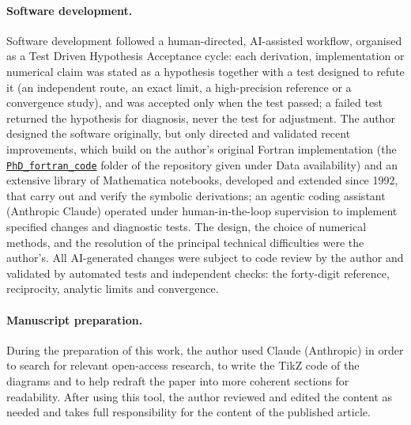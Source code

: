 \documentclass[11pt,a4paper]{article}
\begin{document}
\paragraph{Software development.} Software development followed a human-directed, AI-assisted
workflow, organised as a Test Driven Hypothesis Acceptance cycle: each derivation, implementation or
numerical claim was stated as a hypothesis together with a test designed to refute it (an independent
route, an exact limit, a high-precision reference or a convergence study), and was accepted only when
the test passed; a failed test returned the hypothesis for diagnosis, never the test for adjustment. The author designed the software originally, but only directed and validated recent
improvements, which build on the author's original Fortran implementation (the
\href{https://github.com/tmnestor/MultipleScatteringCalculations/tree/main/PhD_fortran_code}{\texttt{PhD\_fortran\_code}}
folder of the repository given under Data availability) and an extensive library of Mathematica notebooks,
developed and extended since 1992, that carry out and verify the symbolic derivations; an agentic coding
assistant (Anthropic Claude) operated under human-in-the-loop supervision to implement specified changes and
diagnostic tests. The design, the choice of numerical methods, and the resolution of the principal
technical difficulties were the author's. All AI-generated changes were subject to code review by the
author and validated by automated tests and independent checks: the forty-digit reference, reciprocity,
analytic limits and convergence.

\paragraph{Manuscript preparation.} During the preparation of this work, the author used Claude
(Anthropic) in order to search for relevant open-access research, to write the TikZ code of the diagrams
and to help redraft the paper into more coherent sections for readability. After using this tool, the
author reviewed and edited the content as needed and takes full responsibility for the content of the
published article.



\end{document}
